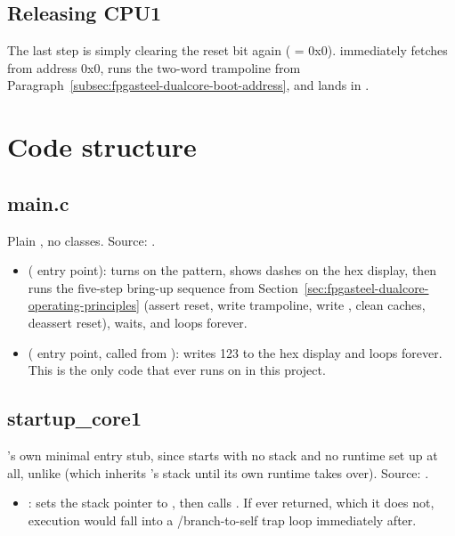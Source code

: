 \subsection{Releasing CPU1}
\label{subsec:fpgasteel-dualcore-releasing-cpu1}

The last step is simply clearing the reset bit again ( = 0x0).  immediately fetches from address 0x0, runs the two-word trampoline from Paragraph~\ref{subsec:fpgasteel-dualcore-boot-address}, and lands in .

\section{Code structure}
\label{sec:fpgasteel-dualcore-code-structure}

\subsection{main.c}
\label{subsec:fpgasteel-dualcore-main-c}

Plain , no classes. Source: .

\begin{itemize}
    \item {} ( entry point): turns on the  pattern, shows dashes on the hex display, then runs the five-step  bring-up sequence from Section~\ref{sec:fpgasteel-dualcore-operating-principles} (assert reset, write trampoline, write , clean caches, deassert reset), waits, and loops forever.
    \item {} ( entry point, called from ): writes 123 to the hex display and loops forever. This is the only code that ever runs on  in this project.
\end{itemize}

\subsection{startup\_core1}
\label{subsec:fpgasteel-dualcore-startup-core1}

's own minimal entry stub, since  starts with no stack and no runtime set up at all, unlike  (which inherits 's stack until its own  runtime takes over). Source: .

\begin{itemize}
    \item {}: sets the stack pointer to , then calls . If  ever returned, which it does not, execution would fall into a /branch-to-self trap loop immediately after.
\end{itemize}

